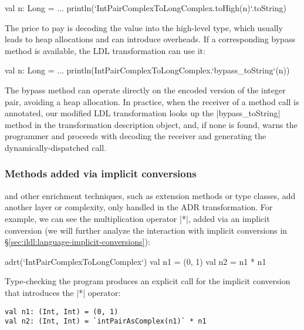 \begin{lstlisting-nobreak}
val n: Long = ...
println(`IntPairComplexToLongComplex.toHigh(n)`.toString)
\end{lstlisting-nobreak}

The price to pay is decoding the value into the high-level type, which usually leads to heap allocations and can introduce overheads. If a corresponding bypass method is available, the LDL transformation can use it:

\begin{lstlisting-nobreak}
val n: Long = ...
println(IntPairComplexToLongComplex.`bypass_toString`(n))
\end{lstlisting-nobreak}

The bypass method can operate directly on the encoded version of the integer pair, avoiding a heap allocation. In practice, when the receiver of a method call is annotated, our modified LDL transformation looks up the |bypass_toString| method in the transformation description object, and, if none is found, warns the programmer and proceeds with decoding the receiver and generating the dynamically-dispatched call.

\vspace{-0.2em}
\subsubsection{Methods added via implicit conversions} and other enrichment techniques, such as extension methods or type classes, add another layer or complexity, only handled in the ADR transformation. For example, we can see the multiplication operator |*|, added via an implicit conversion (we will further analyze the interaction with implicit conversions in \S\ref{sec:ildl:language-implicit-conversions}):

\begin{lstlisting-nobreak}
adrt(`IntPairComplexToLongComplex`) {
  val n1 = (0, 1)
  val n2 = n1 * n1
}
\end{lstlisting-nobreak}

Type-checking the program produces an explicit call for the implicit conversion that introduces the |*| operator:

\vspace{-0.5em}
\begin{lstlisting}
val n1: (Int, Int) = (0, 1)
val n2: (Int, Int) = `intPairAsComplex(n1)` * n1
\end{lstlisting}

